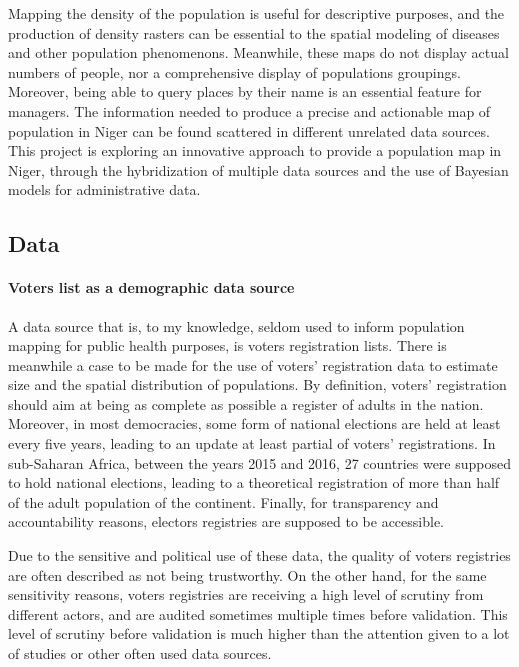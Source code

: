 Mapping the density of the population is useful for descriptive purposes, and the production of density rasters can be essential to the spatial modeling of diseases and other population phenomenons. Meanwhile, these maps do not display actual numbers of people, nor a comprehensive display of populations groupings. Moreover, being able to query places by their name is an essential feature for managers. The information needed to produce a precise and actionable map of population in Niger can be found scattered in different unrelated data sources. This  project is exploring an innovative approach to provide a population map in Niger, through the hybridization of multiple data sources and the use of Bayesian models for administrative data.

\subsection{Data}

\paragraph{Voters list as a demographic data source} A data source that is, to my knowledge, seldom used to inform population mapping for public health purposes, is voters registration lists. There is meanwhile a case to be made for the use of voters' registration data to estimate size and the spatial distribution of populations. By definition, voters' registration should aim at being as complete as possible a register of adults in the nation. Moreover, in most democracies, some form of national elections are held at least  every five years, leading to an update at least partial of voters' registrations. In sub-Saharan Africa, between the years 2015 and 2016, 27 countries were supposed to hold national elections, leading to a theoretical registration of more than half of the adult population of the continent. Finally, for transparency and accountability reasons, electors registries are supposed to be accessible.

Due to the sensitive and political use of these data, the quality of voters registries are often described as not being trustworthy. On the other hand, for the same sensitivity reasons, voters registries are receiving a high level of scrutiny from different actors, and are audited sometimes multiple times before validation. This level of scrutiny before validation is much higher than the attention given to a lot of studies or other often used data sources.

